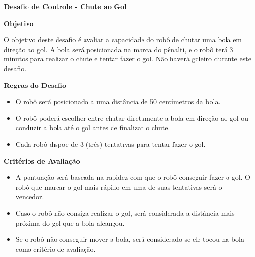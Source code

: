 \clearpage
\sffamily
{\bfseries\color[rgb]{0.4,0.4,0.4}Desafio de Controle - Chute ao Gol}
{}

\bigskip

{\bfseries Objetivo}

\headlinebox

O objetivo deste desafio é avaliar a capacidade do robô de chutar uma bola em direção ao gol. A bola será posicionada na marca do pênalti, e o robô terá 3 minutos para realizar o chute e tentar fazer o gol. Não haverá goleiro durante este desafio.

\bigskip

{\bfseries Regras do Desafio}

\headlinebox

\begin{itemize}
	\item O robô será posicionado a uma distância de 50 centímetros da bola.
	\item O robô poderá escolher entre chutar diretamente a bola em direção ao gol ou conduzir a bola até o gol antes de finalizar o chute.
	\item Cada robô dispõe de 3 (três) tentativas para tentar fazer o gol.
\end{itemize}

\bigskip

{\bfseries Critérios de Avaliação}

\headlinebox

\begin{itemize}
	\item A pontuação será baseada na rapidez com que o robô conseguir fazer o gol. O robô que marcar o gol mais rápido em uma de suas tentativas será o vencedor.
	\item Caso o robô não consiga realizar o gol, será considerada a distância mais próxima do gol que a bola alcançou.
	\item Se o robô não conseguir mover a bola, será considerado se ele tocou na bola como critério de avaliação.
\end{itemize}